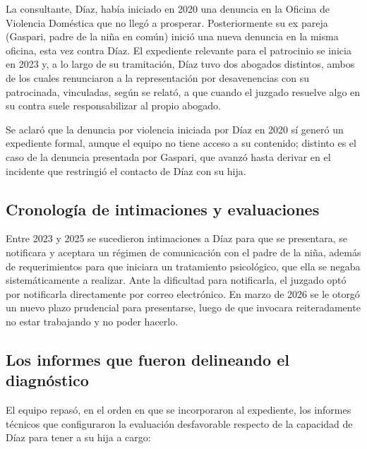 \documentclass[12pt,oneside]{book}
\begin{document}
La consultante, Díaz, había iniciado en 2020 una denuncia en la Oficina de Violencia Doméstica que no llegó a prosperar. Posteriormente su ex pareja (Gaspari, padre de la niña en común) inició una nueva denuncia en la misma oficina, esta vez contra Díaz. El expediente relevante para el patrocinio se inicia en 2023 y, a lo largo de su tramitación, Díaz tuvo dos abogados distintos, ambos de los cuales renunciaron a la representación por desavenencias con su patrocinada, vinculadas, según se relató, a que cuando el juzgado resuelve algo en su contra suele responsabilizar al propio abogado.

Se aclaró que la denuncia por violencia iniciada por Díaz en 2020 sí generó un expediente formal, aunque el equipo no tiene acceso a su contenido; distinto es el caso de la denuncia presentada por Gaspari, que avanzó hasta derivar en el incidente que restringió el contacto de Díaz con su hija.

\subsection{Cronología de intimaciones y evaluaciones}

Entre 2023 y 2025 se sucedieron intimaciones a Díaz para que se presentara, se notificara y aceptara un régimen de comunicación con el padre de la niña, además de requerimientos para que iniciara un tratamiento psicológico, que ella se negaba sistemáticamente a realizar. Ante la dificultad para notificarla, el juzgado optó por notificarla directamente por correo electrónico. En marzo de 2026 se le otorgó un nuevo plazo prudencial para presentarse, luego de que invocara reiteradamente no estar trabajando y no poder hacerlo.

\subsection{Los informes que fueron delineando el diagnóstico}

El equipo repasó, en el orden en que se incorporaron al expediente, los informes técnicos que configuraron la evaluación desfavorable respecto de la capacidad de Díaz para tener a su hija a cargo:
\end{document}
